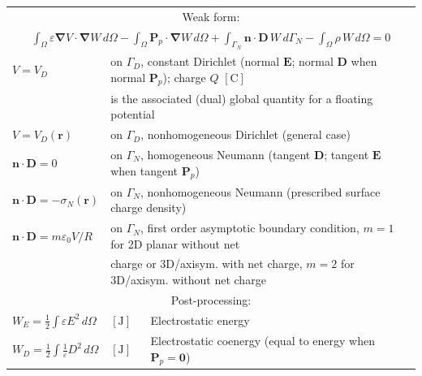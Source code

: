 \documentclass[letterpaper]{article}
\newcommand{\vect}[1]{\mathbf#1}
\newcommand{\nab}{\vect{\nabla}}
\begin{document}
\begin{table}[h!]
\begin{tabular}{lll}
\multicolumn{3}{c}{Weak form:} \\[1pt]
\multicolumn{3}{c}{$\displaystyle\int_\Omega\varepsilon\nab V\cdot\nab W\,d\Omega
-\int_\Omega\vect{P}_p\cdot\nab W\,d\Omega
+\int_{\Gamma_N}\vect{n}\cdot\vect{D}\,W\,d{\Gamma_N}
-\int_\Omega\rho\,W\,d\Omega=0$}\\[8pt]
$V=V_D$ & \multicolumn{2}{l}{on $\Gamma_D$, constant Dirichlet (normal $\vect{E}$; normal $\vect{D}$ when normal $\vect{P}_p$); charge $Q$ $[\text{C}]$}\\
 & \multicolumn{2}{l}{is the associated (dual) global quantity for a floating potential}\\
$V=V_D(\vect{r})$ & \multicolumn{2}{l}{on $\Gamma_D$, nonhomogeneous Dirichlet (general case)}\\
$\vect{n}\cdot\vect{D}=0$ & \multicolumn{2}{l}{on $\Gamma_N$, homogeneous Neumann (tangent $\vect{D}$; tangent $\vect{E}$ when tangent $\vect{P}_p$)}\\
$\vect{n}\cdot\vect{D}=-\sigma_N(\vect{r})$ & \multicolumn{2}{l}{on $\Gamma_N$, nonhomogeneous Neumann (prescribed surface charge density)}\\
$\vect{n}\cdot\vect{D}=m\varepsilon_0V/R$ & \multicolumn{2}{l}{on $\Gamma_N$, first order asymptotic boundary condition, $m=1$ for 2D planar without net}\\
 & \multicolumn{2}{l}{charge or 3D/axisym. with net charge, $m=2$ for 3D/axisym. without net charge }\\
 
\hline
\multicolumn{3}{c}{Post-processing:} \\
$W_E=\frac{1}{2}\!\int\varepsilon E^2\,d\Omega$ & $[\text{J}]$ & Electrostatic energy\\[1pt]
$W_D=\frac{1}{2}\!\int\frac{1}{\varepsilon} D^2\,d\Omega$ & $[\text{J}]$ & Electrostatic coenergy (equal to energy when $\vect{P}_{p}=\vect{0}$)\\[1pt]

 
\hline
\end{tabular}
\end{table}

\end{document}
